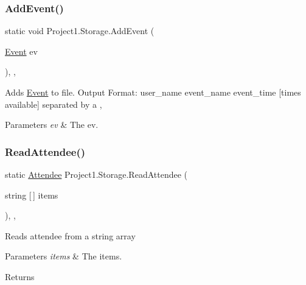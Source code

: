 \subsubsection{\texorpdfstring{Add\+Event()}{AddEvent()}}
{\footnotesize\ttfamily static void Project1.\+Storage.\+Add\+Event (\begin{DoxyParamCaption}\item[{\hyperlink{classProject1_1_1Event}{Event}}]{ev }\end{DoxyParamCaption})\hspace{0.3cm}{\ttfamily [inline]}, {\ttfamily [static]}, {\ttfamily [package]}}



Adds \hyperlink{classProject1_1_1Event}{Event} to file. Output Format\+: user\+\_\+name event\+\_\+name event\+\_\+time \mbox{[}times available\mbox{]} separated by a , 


\begin{DoxyParams}{Parameters}
{\em ev} & The ev.\\
\hline
\end{DoxyParams}
\mbox{\label{classProject1_1_1Storage_a4aebfb33e4df6b8694853cd7c68c4d56}} 
\subsubsection{\texorpdfstring{Read\+Attendee()}{ReadAttendee()}}
{\footnotesize\ttfamily static \hyperlink{classProject1_1_1Attendee}{Attendee} Project1.\+Storage.\+Read\+Attendee (\begin{DoxyParamCaption}\item[{string \mbox{[}$\,$\mbox{]}}]{items }\end{DoxyParamCaption})\hspace{0.3cm}{\ttfamily [inline]}, {\ttfamily [static]}, {\ttfamily [package]}}



Reads attendee from a string array 


\begin{DoxyParams}{Parameters}
{\em items} & The items.\\
\hline
\end{DoxyParams}
\begin{DoxyReturn}{Returns}

\end{DoxyReturn}
\mbox{\label{classProject1_1_1Storage_adba708b66c28fbd3e6dff0fb2117d050}} 

